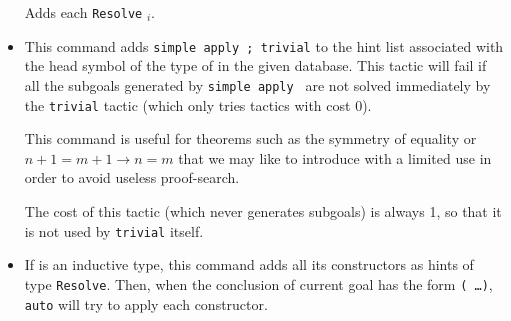 \begin{itemize}
\begin{Variants}
    Adds each \texttt{Resolve} {\term$_i$}.

  \end{Variants}

\item {}

  This command adds {\tt simple apply {\term}; trivial} to the hint list
  associated with the head symbol of the type of {\ident} in the given
  database. This tactic will fail if all the subgoals generated by
  {\tt simple apply {\term}} are not solved immediately by the {\tt trivial}
  tactic (which only tries tactics with cost $0$).

  This command is useful for theorems such as the symmetry of equality
  or $n+1=m+1 \to n=m$ that we may like to introduce with a
  limited use in order to avoid useless proof-search.

  The cost of this tactic (which never generates subgoals) is always 1,
  so that it is not used by {\tt trivial} itself.



\item {}

  If {\ident} is an inductive type, this command adds all its
  constructors as hints of type \texttt{Resolve}. Then, when the
  conclusion of current goal has the form \texttt{({\ident} \dots)},
  \texttt{auto} will try to apply each constructor.

\end{itemize}

